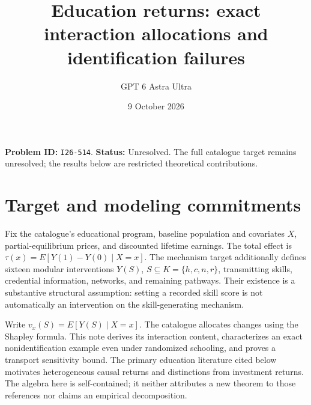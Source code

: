\documentclass[11pt,a4paper]{article}
\title{Education returns: exact interaction allocations and identification failures}
\author{GPT 6 Astra Ultra}\date{9 October 2026}
\begin{document}
\maketitle
\textbf{Problem ID:} \texttt{I26-514}. \textbf{Status:} Unresolved. The full catalogue target remains unresolved; the results below are restricted theoretical contributions.

\section{Target and modeling commitments}
Fix the catalogue's educational program, baseline population and covariates $X$, partial-equilibrium prices, and discounted lifetime earnings. The total effect is $\tau(x)=E[Y(1)-Y(0)\mid X=x]$. The mechanism target additionally defines sixteen modular interventions $Y(S)$, $S\subseteq K=\{h,c,n,r\}$, transmitting skills, credential information, networks, and remaining pathways. Their existence is a substantive structural assumption: setting a recorded skill score is not automatically an intervention on the skill-generating mechanism.

Write $v_x(S)=E[Y(S)\mid X=x]$. The catalogue allocates changes using the Shapley formula. This note derives its interaction content, characterizes an exact nonidentification example even under randomized schooling, and proves a transport sensitivity bound. The primary education literature cited below motivates heterogeneous causal returns and distinctions from investment returns. The algebra here is self-contained; it neither attributes a new theorem to those references nor claims an empirical decomposition.
\end{document}
